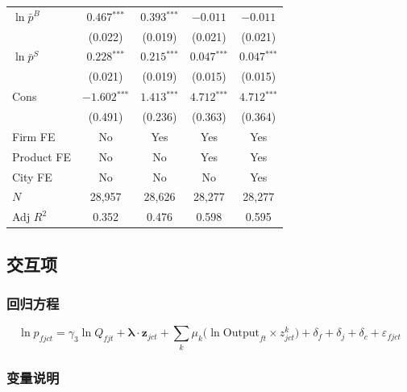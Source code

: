 \documentclass[12pt]{article}
\newcommand{\sym}[1]{\ensuremath{^{\text{#1}}}}
\newcommand{\se}[1]{{\small(#1)}}
\begin{document}
\begin{table}[H]
\begin{threeparttable}
\begin{tabular}{lcccc}
      $\ln\bar{p}^{B}$     & $0.467\sym{***}$ & $0.393\sym{***}$ & $-0.011$  & $-0.011$  \\
                           & \se{0.022}       & \se{0.019}       & \se{0.021} & \se{0.021} \\[4pt]
      $\ln\bar{p}^{S}$     & $0.228\sym{***}$ & $0.215\sym{***}$ & $0.047\sym{***}$  & $0.047\sym{***}$  \\
                           & \se{0.021}       & \se{0.019}       & \se{0.015} & \se{0.015} \\[4pt]
      Cons               & $-1.602\sym{***}$ & $1.413\sym{***}$ & $4.712\sym{***}$ & $4.712\sym{***}$ \\
                           & \se{0.491} & \se{0.236}      & \se{0.363}       & \se{0.364}       \\
      \midrule
      Firm FE              & No  & Yes & Yes & Yes \\
      Product FE           & No  & No  & Yes & Yes \\
      City FE              & No  & No  & No  & Yes \\
      $N$                  & 28,957 & 28,626 & 28,277 & 28,277 \\
      Adj $R^2$            & 0.352  & 0.476  & 0.598  & 0.595  \\
      \bottomrule
    \end{tabular}
  \end{threeparttable}
\end{table}



\subsection{交互项}

\subsubsection*{回归方程}

\begin{equation}
  \ln p_{fjct} = \gamma_3 \ln Q_{fjt} + \boldsymbol{\lambda} \cdot \mathbf{z}_{jct}
    + \sum_{k} \mu_k \bigl(\ln\mathrm{Output}_{ft} \times z^k_{jct}\bigr)
    + \delta_f + \delta_j + \delta_c + \varepsilon_{fjct}
\end{equation}


\subsubsection*{变量说明}
\end{document}
